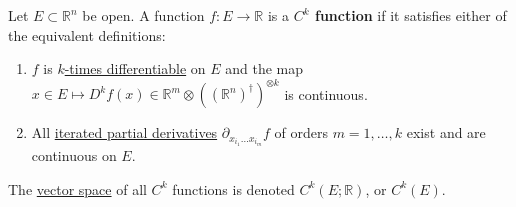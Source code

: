   \begin{definition}[$C^k$ Functions]
    \label{def:ck_functions}
    Let $E \subset \mathbb{R}^n$ be open. A function $f: E \to \mathbb{R}$ is a \textbf{$C^k$ function} if it satisfies either of the equivalent definitions: 
    \begin{enumerate}
      \item $f$ is \hyperref[def:kth-frechet-derivative]{$k$-times differentiable} on $E$ and the map $x \in E \mapsto D^k f(x) \in \mathbb{R}^m \otimes ((\mathbb{R}^n)^\dagger)^{\otimes k}$ is continuous. 
      \item All \hyperref[def:kth-partial-derivative]{iterated partial derivatives} $\partial_{x_{i_1} \ldots x_{i_m}} f$ of orders $m = 1, \ldots, k$ exist and are continuous on $E$. 
    \end{enumerate}
    The \hyperref[lin-def:vector-space]{vector space} of all $C^k$ functions is denoted $C^k (E; \mathbb{R})$, or $C^k(E)$. 
  \end{definition}
